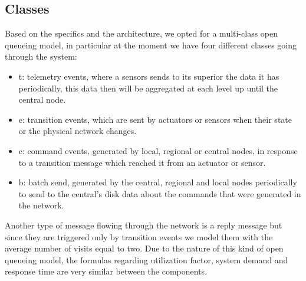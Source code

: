\documentclass[11pt]{article}
\begin{document}
\subsection{Classes}
Based on the specifics and the architecture, we opted for a multi-class open queueing model, in particular at the moment we have four different classes going through the system:
\begin{itemize}
\item t: telemetry events, where a sensors sends to its superior the data it has periodically, this data then will be aggregated at each level up until the central node.
\item e: transition events, which are sent by actuators or sensors when their state or the physical network changes.
\item c: command events, generated by local, regional or central nodes, in response to a transition message which reached it from an actuator or sensor.
\item b: batch send, generated by the central, regional and local nodes periodically to send to the central's disk data about the commands that were generated in the network.
\end{itemize}
Another type of message flowing through the network is a reply message but since they are triggered only by transition events we model them with the average number of visits equal to two.
Due to the nature of this kind of open queueing model, the formulas regarding utilization factor, system demand and response time are very similar between the components.
\end{document}
